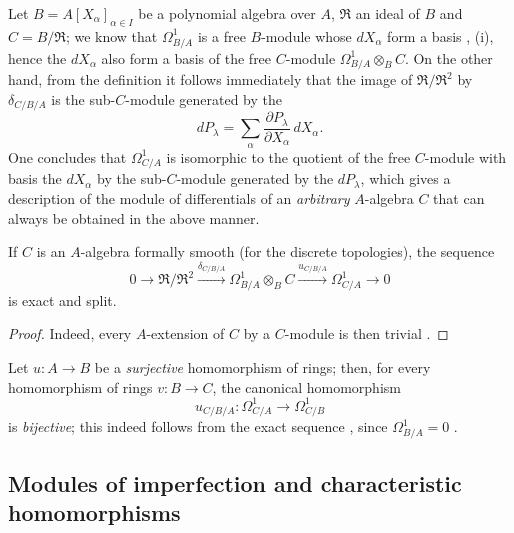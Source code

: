 \begin{example}[20.5.13]
\label{0.20.5.13}
Let $B=A[X_\alpha]_{\alpha\in I}$ be a polynomial algebra over $A$, $\mathfrak{R}$ an ideal of $B$ and $C=B/\mathfrak{R}$; we know that $\Omega^1_{B/A}$ is a free $B$-module whose $dX_\alpha$ form a basis , (i), hence the $dX_\alpha$ also form a basis of the free $C$-module $\Omega^1_{B/A}\otimes_B C$.
On the other hand, from the definition it follows immediately that the image of $\mathfrak{R}/\mathfrak{R}^2$ by $\delta_{C/B/A}$ is the sub-$C$-module generated by the
\[
  dP_\lambda=\sum_\alpha\frac{\partial P_\lambda}{\partial X_\alpha}\,dX_\alpha.
\]
One concludes that $\Omega^1_{C/A}$ is isomorphic to the quotient of the free $C$-module with basis the $dX_\alpha$ by the sub-$C$-module generated by the $dP_\lambda$, which gives a description of the module of differentials of an \emph{arbitrary} $A$-algebra $C$ that can always be obtained in the above manner.
\end{example}

\begin{corollary}[20.5.14]
\label{0.20.5.14}
If $C$ is an $A$-algebra formally smooth \textup{(}for the discrete topologies\textup{)}, the sequence
\begin{equation}
\tag{20.5.14.1}
  \label{0.20.5.14.1}
  0\to\mathfrak{R}/\mathfrak{R}^2\xrightarrow{\delta_{C/B/A}}\Omega^1_{B/A}\otimes_B C\xrightarrow{u_{C/B/A}}\Omega^1_{C/A}\to 0
\end{equation}
is exact and split.
\end{corollary}

\begin{proof}
Indeed, every $A$-extension of $C$ by a $C$-module is then trivial .
\end{proof}

\begin{remark}[20.5.15]
\label{0.20.5.15}
Let $u:A\to B$ be a \emph{surjective} homomorphism of rings; then, for every homomorphism of rings $v:B\to C$, the canonical homomorphism
\begin{equation}
\tag{20.5.15.1}
  \label{0.20.5.15.1}
  u_{C/B/A}:\Omega^1_{C/A}\to\Omega^1_{C/B}
\end{equation}
is \emph{bijective}; this indeed follows from the exact sequence , since $\Omega^1_{B/A}=0$ .
\end{remark}

\subsection{Modules of imperfection and characteristic homomorphisms}
\label{subsection:0.20.6}
\label{0.20.6}

